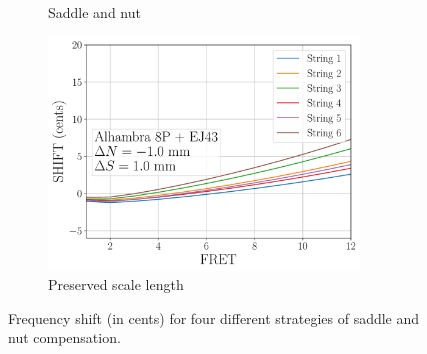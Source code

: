 \begin{figure}
\begin{subfigure}[b]{0.45\textwidth}
   \caption{Saddle and nut}
   \label{fig:shift_compensated_1}
  \end{subfigure}
  \hspace{0.25in}
  \begin{subfigure}[b]{0.45\textwidth}
   \centering
   \includegraphics[width=3.25in]{figures/shift_compensated_2}
   \caption{Preserved scale length}
   \label{fig:shift_compensated_2}
  \end{subfigure}
  \caption{\label{fig:compensation} Frequency shift (in cents) for four different strategies of saddle and nut compensation.}
 \end{figure}


